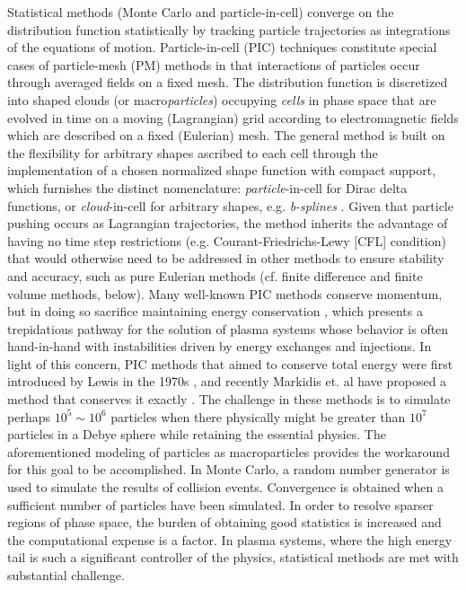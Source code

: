 \documentclass[11pt,titlepage]{report}
\begin{document}
\indent\indent Statistical methods (Monte Carlo and particle-in-cell) converge on the distribution function statistically by tracking particle trajectories as integrations of the equations of motion. Particle-in-cell (PIC) techniques constitute special cases of particle-mesh (PM) methods in that interactions of particles occur through averaged fields on a fixed mesh. The distribution function is discretized into shaped clouds (or macro\emph{particles}) occupying \emph{cells} in phase space that are evolved in time on a moving (Lagrangian) grid according to electromagnetic fields which are described on a fixed (Eulerian) mesh. The general method is built on the flexibility for arbitrary shapes ascribed to each cell through the implementation of a chosen normalized shape function with compact support, which furnishes the distinct nomenclature: \emph{particle}-in-cell for Dirac delta functions, or \emph{cloud}-in-cell for arbitrary shapes, e.g. \emph{b-splines} \cite{Lapenta}. Given that particle pushing occurs as Lagrangian trajectories, the method inherits the advantage of having no time step restrictions (e.g. Courant-Friedrichs-Lewy [CFL] condition) that would otherwise need to be addressed in other methods to ensure stability and accuracy, such as pure Eulerian methods (cf. finite difference and finite volume methods, below). Many well-known PIC methods conserve momentum, but in doing so sacrifice maintaining energy conservation \cite{Birdsall, Hockney}, which presents a trepidatious pathway for the solution of plasma systems whose behavior is often hand-in-hand with instabilities driven by energy exchanges and injections. In light of this concern, PIC methods that aimed to conserve total energy were first introduced by Lewis in the 1970s \cite{Lewis70}, and recently Markidis et. al have proposed a method that conserves it exactly \cite{Markidis11}. The challenge in these methods is to simulate perhaps $10^5 \sim 10^6$ particles when there physically might be greater than $10^7$ particles in a Debye sphere while retaining the essential physics. The aforementioned modeling of particles as macroparticles provides the workaround for this goal to be accomplished. In Monte Carlo, a random number generator is used to simulate the results of collision events. Convergence is obtained when a sufficient number of particles have been simulated. In order to resolve sparser regions of phase space, the burden of obtaining good statistics is increased and the computational expense is a factor. In plasma systems, where the high energy tail is such a significant controller of the physics, statistical methods are met with substantial challenge. 
\end{document}
